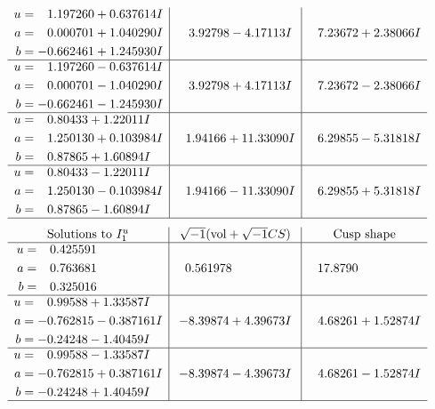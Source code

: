 \documentclass[1p]{elsarticle_modified}
\theoremstyle{definition}
\newcommand{\I}{\sqrt{-1}}
\begin{document}
$$\begin{array}{c|c|c}
\begin{aligned}
u &= \phantom{-}1.197260 + 0.637614 I \\
a &= \phantom{-}0.000701 + 1.040290 I \\
b &= -0.662461 + 1.245930 I\end{aligned}
 & \phantom{-}3.92798 - 4.17113 I & \phantom{-}7.23672 + 2.38066 I \\ \hline\begin{aligned}
u &= \phantom{-}1.197260 - 0.637614 I \\
a &= \phantom{-}0.000701 - 1.040290 I \\
b &= -0.662461 - 1.245930 I\end{aligned}
 & \phantom{-}3.92798 + 4.17113 I & \phantom{-}7.23672 - 2.38066 I \\ \hline\begin{aligned}
u &= \phantom{-}0.80433 + 1.22011 I \\
a &= \phantom{-}1.250130 + 0.103984 I \\
b &= \phantom{-}0.87865 + 1.60894 I\end{aligned}
 & \phantom{-}1.94166 + 11.33090 I & \phantom{-}6.29855 - 5.31818 I \\ \hline\begin{aligned}
u &= \phantom{-}0.80433 - 1.22011 I \\
a &= \phantom{-}1.250130 - 0.103984 I \\
b &= \phantom{-}0.87865 - 1.60894 I\end{aligned}
 & \phantom{-}1.94166 - 11.33090 I & \phantom{-}6.29855 + 5.31818 I\\
 \hline 
 \end{array}$$\newpage$$\begin{array}{c|c|c}  
\text{Solutions to }I^u_{1}& \I (\text{vol} + \sqrt{-1}CS) & \text{Cusp shape}\\
 \hline 
\begin{aligned}
u &= \phantom{-}0.425591\phantom{ +0.000000I} \\
a &= \phantom{-}0.763681\phantom{ +0.000000I} \\
b &= \phantom{-}0.325016\phantom{ +0.000000I}\end{aligned}
 & \phantom{-}0.561978\phantom{ +0.000000I} & \phantom{-}17.8790\phantom{ +0.000000I} \\ \hline\begin{aligned}
u &= \phantom{-}0.99588 + 1.33587 I \\
a &= -0.762815 - 0.387161 I \\
b &= -0.24248 - 1.40459 I\end{aligned}
 & -8.39874 + 4.39673 I & \phantom{-}4.68261 + 1.52874 I \\ \hline\begin{aligned}
u &= \phantom{-}0.99588 - 1.33587 I \\
a &= -0.762815 + 0.387161 I \\
b &= -0.24248 + 1.40459 I\end{aligned}
 & -8.39874 - 4.39673 I & \phantom{-}4.68261 - 1.52874 I\\
 \hline 
 \end{array}$$\newpage\newpage\renewcommand{\arraystretch}{1}
\end{document}
